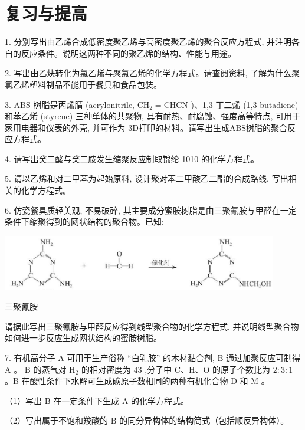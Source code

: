\documentclass[10pt]{article}
\begin{document}
\section*{复习与提高}

1. 分别写出由乙烯合成低密度聚乙烯与高密度聚乙烯的聚合反应方程式, 并注明各自的反应条件。说明这两种不同的聚乙烯的结构、性能与用途。

2. 写出由乙炔转化为氯乙烯与聚氯乙烯的化学方程式。请查阅资料, 了解为什么聚氯乙烯塑料制品不能用于餐具和食品包装。

3. ABS 树脂是丙烯腈 (acrylonitrile, \({\mathrm{{CH}}}_{2} = \mathrm{{CHCN}}\) )、1,3-丁二烯 (1,3-butadiene) 和苯乙烯 (styrene) 三种单体的共聚物, 具有耐热、耐腐蚀、强度高等特点, 可用于家用电器和仪表的外壳, 并可作为 3D打印的材料。请写出生成ABS树脂的聚合反应方程式。

4. 请写出癸二酸与癸二胺发生缩聚反应制取锦纶 1010 的化学方程式。

5. 请以乙烯和对二甲苯为起始原料, 设计聚对苯二甲酸乙二酯的合成路线, 写出相关的化学方程式。

6. 仿瓷餐具质轻美观, 不易破碎, 其主要成分蜜胺树脂是由三聚氰胺与甲醛在一定条件下缩聚得到的网状结构的聚合物。已知:

\begin{center}
\includegraphics[max width=0.9\textwidth]{images/0190efc5-b58a-7c43-bfb0-e0a030df9cfd_158_904429.jpg}
\end{center}

三聚氰胺

请据此写出三聚氰胺与甲醛反应得到线型聚合物的化学方程式, 并说明线型聚合物如何进一步反应生成网状结构的蜜胺树脂。

7. 有机高分子 \(\mathrm{A}\) 可用于生产俗称 “白乳胶” 的木材黏合剂, \(\mathrm{B}\) 通过加聚反应可制得 \(\mathrm{A}\) 。 \(\mathrm{B}\) 的蒸气对 \({\mathrm{H}}_{2}\) 的相对密度为 \({43}\) ,分子中 \(\mathrm{C}\text{、}\mathrm{H}\text{、}\mathrm{O}\) 的原子个数比为 \(2 : 3 : 1\) 。B 在酸性条件下水解可生成碳原子数相同的两种有机化合物 \(\mathrm{D}\) 和 \(\mathrm{M}\) 。

（1）写出 \(\mathrm{B}\) 在一定条件下生成 \(\mathrm{A}\) 的化学方程式。

（2）写出属于不饱和羧酸的 \(\mathrm{B}\) 的同分异构体的结构简式（包括顺反异构体）。
\end{document}
